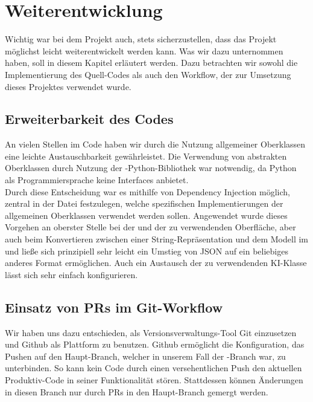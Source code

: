 \chapter{Weiterentwicklung}
\label{ch:weiterentwicklung}

Wichtig war bei dem Projekt auch, stets sicherzustellen, dass das Projekt möglichst leicht weiterentwickelt werden kann.
Was wir dazu unternommen haben, soll in diesem Kapitel erläutert werden.
Dazu betrachten wir sowohl die Implementierung des Quell-Codes als auch den Workflow, der zur Umsetzung dieses Projektes
verwendet wurde.

\section{Erweiterbarkeit des Codes}
\label{sec:erweiterbarkeit}

An vielen Stellen im Code haben wir durch die Nutzung allgemeiner Oberklassen eine leichte Austauschbarkeit
gewährleistet.
Die Verwendung von abstrakten Oberklassen durch Nutzung der -Python-Bibliothek war notwendig, da Python
als Programmiersprache keine Interfaces anbietet. \\

Durch diese Entscheidung war es mithilfe von Dependency Injection möglich, zentral in der Datei 
festzulegen, welche spezifischen Implementierungen der allgemeinen Oberklassen verwendet werden sollen.
Angewendet wurde dieses Vorgehen an oberster Stelle bei der  und der zu verwendenden Oberfläche, aber
auch beim Konvertieren zwischen einer String-Repräsentation und dem Modell im  und 
ließe sich prinzipiell sehr leicht ein Umstieg von JSON auf ein beliebiges anderes Format ermöglichen.
Auch ein Austausch der zu verwendenden \ac{KI}-Klasse lässt sich sehr einfach konfigurieren.

\section{Einsatz von PRs im Git-Workflow}
\label{sec:git-workflow}

Wir haben uns dazu entschieden, als Versionsverwaltungs-Tool Git einzusetzen und Github als Plattform zu benutzen.
Github ermöglicht die Konfiguration, das Pushen auf den Haupt-Branch, welcher in unserem Fall der -Branch war,
zu unterbinden.
So kann kein Code durch einen versehentlichen Push den aktuellen Produktiv-Code in seiner Funktionalität stören.
Stattdessen können Änderungen in diesen Branch nur durch \ac{PR}s in den Haupt-Branch gemergt werden. \\

